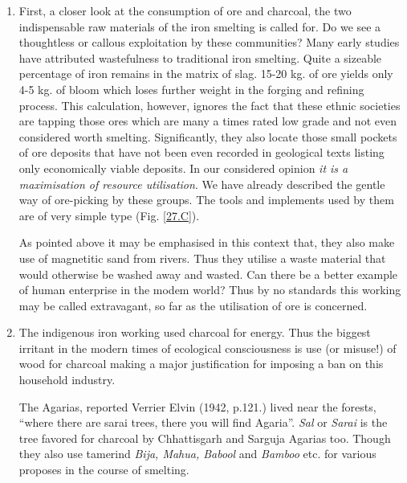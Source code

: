 \begin{enumerate}[1)]
\item First, a closer look at the consumption of ore and charcoal, the two indispensable raw materials of the iron smelting is called for. Do we see a thoughtless or callous exploitation by these communities? Many early studies have attributed wastefulness to traditional iron smelting. Quite a sizeable percentage of iron remains in the matrix of slag. 15-20 kg. of ore yields only 4-5 kg. of bloom which loses further weight in the forging  and refining process. This calculation, however, ignores the fact that these ethnic societies are tapping those ores which are many a times rated low grade and not even considered worth smelting. Significantly, they also locate those small pockets of ore deposits that have not been even recorded in geological texts listing only economically viable deposits. In our considered opinion {\it it is a maximisation of resource utilisation}. We have already described the gentle way of ore-picking by these groups. The tools and implements used by them are of very simple type (Fig. \ref{27.C}).

As pointed above it may be emphasised in this context that, they also make use of magnetitic sand from rivers. Thus they utilise a waste material that would otherwise be washed away and wasted. Can there be a better example of human enterprise in the modem world? Thus by no standards this working may be called extravagant, so far as the utilisation of ore is concerned.
\item The indigenous iron working used charcoal for energy. Thus the biggest irritant in the modern times of ecological consciousness is use (or misuse!) of wood for charcoal making a major justification for imposing a ban on this household industry. 

The Agarias, reported Verrier Elvin (1942, p.121.) lived near the forests, “where there are sarai trees, there you will find Agaria”. {\it Sal} or {\it Sarai} is the tree favored for charcoal by Chhattisgarh and Sarguja Agarias too. Though they also use tamerind {\it Bija, Mahua, Babool} and {\it Bamboo} etc. for various proposes in the course of smelting. 
\end{enumerate}

